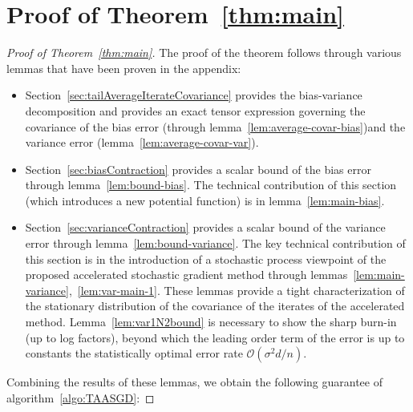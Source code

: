 \section{Proof of Theorem~\ref{thm:main}}\label{sec:proofMainTheorem}
\begin{proof}[Proof of Theorem~\ref{thm:main}]
	The proof of the theorem follows through various lemmas that have been proven in the appendix:
	\begin{itemize}
	\item Section~\ref{sec:tailAverageIterateCovariance} provides the bias-variance decomposition and provides an exact tensor expression governing the covariance of the bias error (through lemma~\ref{lem:average-covar-bias})and the variance error (lemma~\ref{lem:average-covar-var}).
	\item Section~\ref{sec:biasContraction} provides a scalar bound of the bias error through lemma~\ref{lem:bound-bias}. The technical contribution of this section (which introduces a new potential function) is in lemma~\ref{lem:main-bias}. 
	\item Section~\ref{sec:varianceContraction} provides a scalar bound of the variance error through lemma~\ref{lem:bound-variance}. The key technical contribution of this section is in the introduction of a stochastic process viewpoint of the proposed accelerated stochastic gradient method through lemmas~\ref{lem:main-variance},~\ref{lem:var-main-1}. These lemmas provide a tight characterization of the stationary distribution of the covariance of the iterates of the accelerated method. Lemma~\ref{lem:var1N2bound} is necessary to show the sharp burn-in (up to log factors), beyond which the leading order term of the error is up to constants the statistically optimal error rate $\mathcal{O}(\sigma^2 d/n)$.
	\end{itemize}
	Combining the results of these lemmas, we obtain the following guarantee of algorithm~\ref{algo:TAASGD}:
	

\end{proof}
